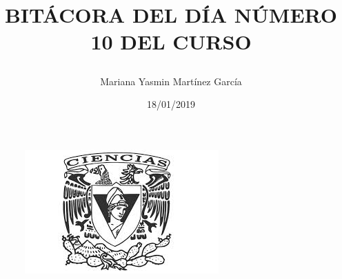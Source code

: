 \documentclass{article}
\title{\Huge\item\color{blue}\textbf{BITÁCORA DEL DÍA NÚMERO 10 DEL CURSO}}
\author{\Large Mariana Yasmin Martínez García}
\date{\Large 18/01/2019}
\begin{document}
\begin{figure}[t]
	\centering
	\includegraphics[width=0.7\linewidth]{Imagenes/1}
	\caption{}
	\label{fig:1}
\end{figure}

	\maketitle
		
	\newpage
	
\end{document}
